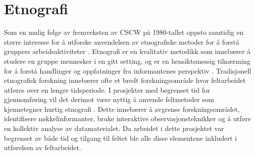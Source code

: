 \section{Etnografi}
\label{section:etnografi} 

Som en mulig følge av fremveksten av CSCW på 1980-tallet oppsto samtidig en større interesse for å utforske anvendelsen av etnografiske metoder for å forstå gruppers arbeidsaktiviteter \citep{Blomberg93}. Etnografi er en kvalitativ metodikk som innebærer å studere en gruppe mennesker i en gitt setting, og er en hensiktsmessig tilnærming for å forstå handlinger og oppfatninger fra informantenes perspektiv \citep{Blomberg93, Reeves08, Nardi97}. Tradisjonell etnografisk forskning innebærer ofte et bredt forskningsområde hvor feltarbeidet utføres over en lengre tidsperiode. I prosjekter med begrenset tid for gjennomføring vil det derimot være nyttig å anvende feltmetoder som kjennetegner hurtig etnografi \citep{Millen00}. Dette innebærer å avgrense forskningsområdet, identifisere nøkkelinformanter, bruke interaktive observasjonsteknikker og å utføre en kollektiv analyse av datamaterialet. Da arbeidet i dette prosjektet var begrenset av både tid og tilgang til feltet ble alle disse elementene inkludert i utførelsen av feltarbeidet.



